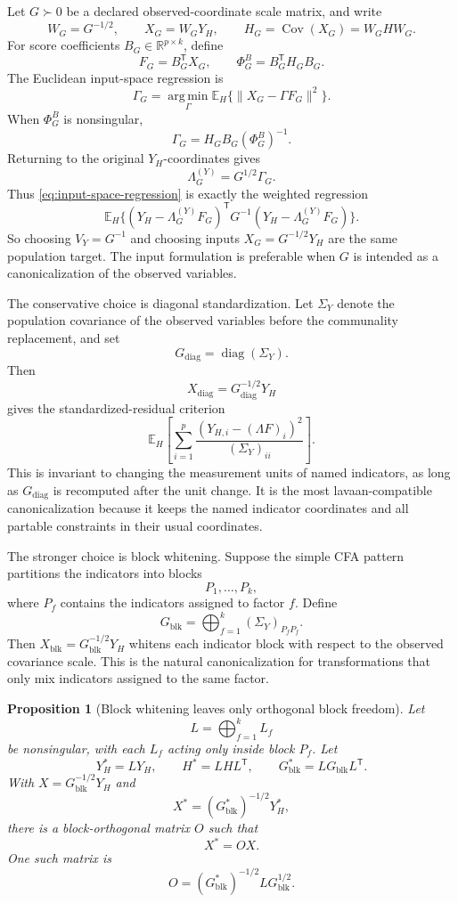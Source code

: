 \documentclass[11pt]{article}
\newcommand{\T}{^{\mathsf T}}
\newcommand{\E}{\mathbb{E}}
\newcommand{\Cov}{\operatorname{Cov}}
\newcommand{\diag}{\operatorname{diag}}
\newcommand{\argmin}{\operatorname*{arg\,min}}
\theoremstyle{plain}
\newtheorem{proposition}{Proposition}
\theoremstyle{remark}
\begin{document}
Let \(G\succ0\) be a declared observed-coordinate scale matrix, and write
\[
  W_G=G^{-1/2},
  \qquad
  X_G=W_GY_H,
  \qquad
  H_G=\Cov(X_G)=W_GHW_G .
\]
For score coefficients \(B_G\in\mathbb R^{p\times k}\), define
\[
  F_G=B_G\T X_G,
  \qquad
  \Phi_G^B=B_G\T H_GB_G .
\]
The Euclidean input-space regression is
\begin{equation}\label{eq:input-space-regression}
  \Gamma_G
  =
  \argmin_{\Gamma}
  \E_H\{\lVert X_G-\Gamma F_G\rVert^2\}.
\end{equation}
When \(\Phi_G^B\) is nonsingular,
\[
  \Gamma_G=H_GB_G(\Phi_G^B)^{-1}.
\]
Returning to the original \(Y_H\)-coordinates gives
\[
  \Lambda_G^{(Y)}=G^{1/2}\Gamma_G .
\]
Thus \eqref{eq:input-space-regression} is exactly the weighted regression
\[
  \E_H\{(Y_H-\Lambda_G^{(Y)}F_G)\T
        G^{-1}
        (Y_H-\Lambda_G^{(Y)}F_G)\}.
\]
So choosing \(V_Y=G^{-1}\) and choosing inputs \(X_G=G^{-1/2}Y_H\) are the same
population target. The input formulation is preferable when \(G\) is intended
as a canonicalization of the observed variables.

The conservative choice is diagonal standardization. Let \(\Sigma_Y\) denote
the population covariance of the observed variables before the communality
replacement, and set
\[
  G_{\mathrm{diag}}=\diag(\Sigma_Y).
\]
Then
\[
  X_{\mathrm{diag}}=G_{\mathrm{diag}}^{-1/2}Y_H
\]
gives the standardized-residual criterion
\[
  \E_H\left[
    \sum_{i=1}^p
    \frac{(Y_{H,i}-(\Lambda F)_i)^2}{(\Sigma_Y)_{ii}}
  \right].
\]
This is invariant to changing the measurement units of named indicators, as
long as \(G_{\mathrm{diag}}\) is recomputed after the unit change. It is the
most lavaan-compatible canonicalization because it keeps the named indicator
coordinates and all partable constraints in their usual coordinates.

The stronger choice is block whitening. Suppose the simple CFA pattern
partitions the indicators into blocks
\[
  P_1,\ldots,P_k,
\]
where \(P_f\) contains the indicators assigned to factor \(f\). Define
\[
  G_{\mathrm{blk}}
  =
  \bigoplus_{f=1}^k
  (\Sigma_Y)_{P_fP_f}.
\]
Then \(X_{\mathrm{blk}}=G_{\mathrm{blk}}^{-1/2}Y_H\) whitens each indicator
block with respect to the observed covariance scale. This is the natural
canonicalization for transformations that only mix indicators assigned to the
same factor.

\begin{proposition}[Block whitening leaves only orthogonal block freedom]
\label{prop:block-whitening}
Let
\[
  L=\bigoplus_{f=1}^k L_f
\]
be nonsingular, with each \(L_f\) acting only inside block \(P_f\). Let
\[
  Y_H^\ast=LY_H,
  \qquad
  H^\ast=LHL\T,
  \qquad
  G_{\mathrm{blk}}^\ast=LG_{\mathrm{blk}}L\T .
\]
With \(X=G_{\mathrm{blk}}^{-1/2}Y_H\) and
\[
  X^\ast=(G_{\mathrm{blk}}^\ast)^{-1/2}Y_H^\ast,
\]
there is a block-orthogonal matrix \(O\) such that
\[
  X^\ast=OX .
\]
One such matrix is
\[
  O=(G_{\mathrm{blk}}^\ast)^{-1/2}LG_{\mathrm{blk}}^{1/2}.
\]
\end{proposition}
\end{document}
